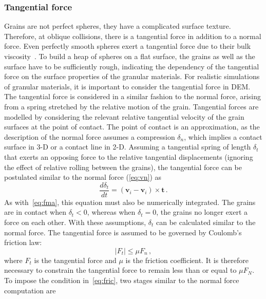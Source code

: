 \subsubsection*{Tangential force}
Grains are not perfect spheres, they have a complicated surface 
texture. Therefore, at oblique collisions, there is a 
tangential force in addition to a normal force. Even perfectly smooth spheres 
exert a tangential force 
due to their bulk viscosity~\citep{Poschel2005}. To build a heap of 
spheres on a flat surface, the grains as well as the surface have to be 
sufficiently rough, indicating the dependency of the tangential force on the 
surface properties of the granular materials. For realistic simulations of 
granular materials, it is important to consider the tangential force in 
DEM. The tangential force is considered in a similar 
fashion to the normal force, arising from a spring stretched by the relative 
motion of the grain. Tangential forces are modelled by considering the relevant 
relative tangential velocity of the grain surfaces at the point of contact. The 
point of contact is an approximation, as the description of the normal force 
assumes a compression $\delta_{n}$, which implies a contact surface in 3-D or a 
contact line in 2-D. Assuming a tangential spring of length $\delta_{t}$ that 
exerts an opposing force to the relative tangential displacements (ignoring the 
effect 
of relative rolling between the grains), the tangential force can be postulated 
similar to the normal force (\cref{eq:vn}) as
%
\begin{equation}
\label{eq:vt}
\frac{d{\delta_{t}}}{dt}=(\mathbf{v}_{\mathit{i}}-\mathbf{v}_{\mathit{i}})\times{\mathbf{t}}
 \,.
\end{equation}
%
As with~\cref{eq:fma}, this equation must also be numerically integrated. The 
grains are in contact when $\delta_{t}<0$, whereas when $\delta_{t}=0$, the 
grains no longer exert a force on each other. With these assumptions, 
$\delta_{t}$ can be calculated similar to the normal force. The tangential 
force is assumed to be governed by Coulomb's friction law:
%
\begin{equation}
\left|F_{\mathit{t}}\right|\le\mu F_{\mathit{n}} \,, \label{eq:fric}
\end{equation}
%
where $F_{\mathit{t}}$ is the tangential force and $\mu$ is the friction 
coefficient. It is therefore necessary to constrain the tangential force to 
remain less than or equal to $\mu F_{N}$. To impose the condition 
in~\cref{eq:fric}, two stages similar to the normal force computation are
